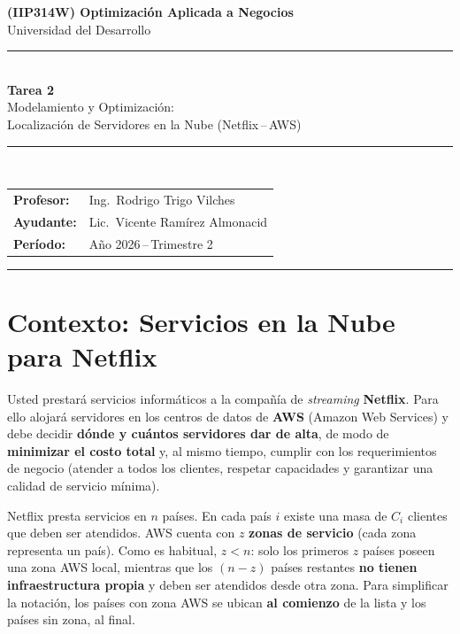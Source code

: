 \documentclass[12pt,a4paper]{article}
\begin{document}

\begin{center}
    {\Large\bfseries\color{uddblue}
     (IIP314W) Optimización Aplicada a Negocios}\\[0.4em]
    {\large Universidad del Desarrollo}\\[0.8em]
    \noindent\rule{\linewidth}{1.5pt}\\[0.5em]
    {\LARGE\bfseries Tarea 2}\\[0.3em]
    {\large Modelamiento y Optimización:\\
     Localización de Servidores en la Nube (Netflix\,--\,AWS)}\\[0.5em]
    \noindent\rule{\linewidth}{1.5pt}\\[0.8em]
    \begin{tabular}{@{}ll@{}}
        \textbf{Profesor:} & Ing.\ Rodrigo Trigo Vilches \\[0.3em]
        \textbf{Ayudante:} & Lic.\ Vicente Ramírez Almonacid \\[0.3em]
        \textbf{Período:}  & Año 2026\,--\,Trimestre 2
    \end{tabular}
\end{center}

\vspace{1em}
\noindent\rule{\linewidth}{0.4pt}
\vspace{0.5em}

\section*{Contexto: Servicios en la Nube para Netflix}

Usted prestará servicios informáticos a la compañía de \emph{streaming}
\textbf{Netflix}. Para ello alojará servidores en los centros de datos de
\textbf{AWS} (Amazon Web Services) y debe decidir \textbf{dónde y cuántos
servidores dar de alta}, de modo de \textbf{minimizar el costo total} y, al
mismo tiempo, cumplir con los requerimientos de negocio (atender a todos los
clientes, respetar capacidades y garantizar una calidad de servicio mínima).

Netflix presta servicios en $n$ países. En cada país $i$ existe una masa de
$C_i$ clientes que deben ser atendidos. AWS cuenta con $z$ \textbf{zonas de
servicio} (cada zona representa un país). Como es habitual, $z < n$: solo los
primeros $z$ países poseen una zona AWS local, mientras que los $(n-z)$ países
restantes \textbf{no tienen infraestructura propia} y deben ser atendidos desde
otra zona. Para simplificar la notación, los países con zona AWS se ubican
\textbf{al comienzo} de la lista y los países sin zona, al final.
\end{document}
